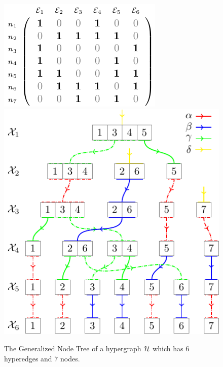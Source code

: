 \documentclass[aps, 10pt, english, twoside, twocolumn, pra, nofootinbib, tightenlines, longbibliography, superscriptaddress]{revtex4-1}
\begin{document}
    \begin{figure}
        \includegraphics[width=\linewidth]{figures/hypergraph_matrix_2_standalone/figure.pdf}
        \includegraphics[width=\linewidth]{figures/generalized_node_tree_2/figure.pdf}
        \caption{The Generalized Node Tree of a hypergraph $\mathcal{H}$ which has $6$ hyperedges and $7$ nodes.}
    \end{figure}
\end{document}
